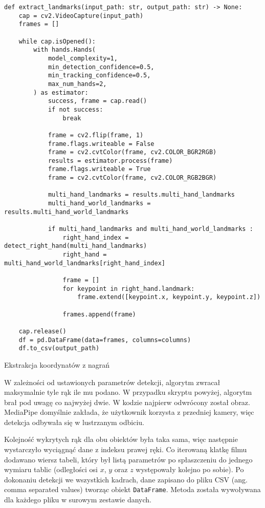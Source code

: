 \begin{listing}[H]
    \color{white}
    \begin{verbatim}
def extract_landmarks(input_path: str, output_path: str) -> None:
    cap = cv2.VideoCapture(input_path)
    frames = []

    while cap.isOpened():
        with hands.Hands(
            model_complexity=1,
            min_detection_confidence=0.5,
            min_tracking_confidence=0.5,
            max_num_hands=2,
        ) as estimator:
            success, frame = cap.read()
            if not success:
                break

            frame = cv2.flip(frame, 1)
            frame.flags.writeable = False
            frame = cv2.cvtColor(frame, cv2.COLOR_BGR2RGB)
            results = estimator.process(frame)
            frame.flags.writeable = True
            frame = cv2.cvtColor(frame, cv2.COLOR_RGB2BGR)

            multi_hand_landmarks = results.multi_hand_landmarks
            multi_hand_world_landmarks = results.multi_hand_world_landmarks

            if multi_hand_landmarks and multi_hand_world_landmarks :
                right_hand_index = detect_right_hand(multi_hand_landmarks)
                right_hand = multi_hand_world_landmarks[right_hand_index]

                frame = []
                for keypoint in right_hand.landmark:
                    frame.extend([keypoint.x, keypoint.y, keypoint.z])

                frames.append(frame)

    cap.release()
    df = pd.DataFrame(data=frames, columns=columns)
    df.to_csv(output_path)
    \end{verbatim}
    \caption{Ekstrakcja koordynatów z nagrań}
    \label{lst:recordings-landmarks-extraction}
\end{listing}

W zależności od ustawionych parametrów detekcji, algorytm zwracał maksymalnie tyle rąk ile mu podano. W przypadku skryptu powyżej, algorytm brał pod uwagę co najwyżej dwie. W kodzie najpierw odwrócony został obraz. MediaPipe domyślnie zakłada, że użytkownik korzysta z przedniej kamery, więc detekcja odbywała się w lustrzanym odbiciu.

Kolejność wykrytych rąk dla obu obiektów była taka sama, więc następnie wystarczyło wyciągnąć dane z indeksu prawej ręki. Co iterowaną klatkę filmu dodawano wiersz tabeli, który był listą parametrów po spłaszczeniu do jednego wymiaru tablic (odległości osi $x$, $y$ oraz $z$ występowały kolejno po sobie). Po dokonaniu detekcji we wszystkich kadrach, dane zapisano do pliku CSV (ang. comma separated values) tworząc obiekt \texttt{DataFrame}. Metoda została wywoływana dla każdego pliku w surowym zestawie danych.

